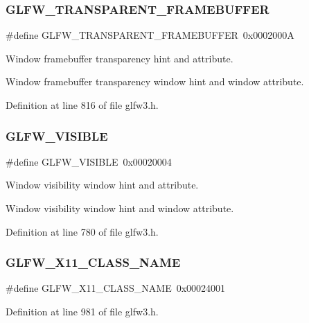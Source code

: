 \subsubsection{\texorpdfstring{GLFW\_TRANSPARENT\_FRAMEBUFFER}{GLFW\_TRANSPARENT\_FRAMEBUFFER}}
{\footnotesize\ttfamily \#define G\+L\+F\+W\+\_\+\+T\+R\+A\+N\+S\+P\+A\+R\+E\+N\+T\+\_\+\+F\+R\+A\+M\+E\+B\+U\+F\+F\+ER~0x0002000A}



Window framebuffer transparency hint and attribute. 

Window framebuffer transparency window hint and window attribute. 

Definition at line 816 of file glfw3.\+h.

\mbox{\label{group__window_gafb3cdc45297e06d8f1eb13adc69ca6c4}} 
\subsubsection{\texorpdfstring{GLFW\_VISIBLE}{GLFW\_VISIBLE}}
{\footnotesize\ttfamily \#define G\+L\+F\+W\+\_\+\+V\+I\+S\+I\+B\+LE~0x00020004}



Window visibility window hint and attribute. 

Window visibility window hint and window attribute. 

Definition at line 780 of file glfw3.\+h.

\mbox{\label{group__window_gae5a9ea2fccccd92edbd343fc56461114}} 
\subsubsection{\texorpdfstring{GLFW\_X11\_CLASS\_NAME}{GLFW\_X11\_CLASS\_NAME}}
{\footnotesize\ttfamily \#define G\+L\+F\+W\+\_\+\+X11\+\_\+\+C\+L\+A\+S\+S\+\_\+\+N\+A\+ME~0x00024001}



Definition at line 981 of file glfw3.\+h.

\mbox{\label{group__window_ga494c3c0d911e4b860b946530a3e389e8}} 

